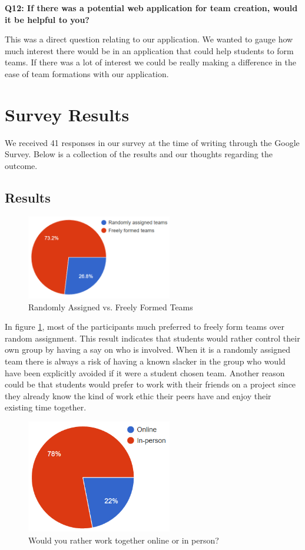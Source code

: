 \documentclass[conference]{IEEEtran}
\begin{document}
\textbf{Q12: If there was a potential web application for team creation, would it be helpful to you?}

This was a direct question relating to our application. We wanted to gauge how much interest there 
would be in an application that could help students to form teams. If there was a lot of interest
we could be really making a difference in the ease of team formations with our application. 

\section{Survey Results}
We received 41 responses in our survey at the time of writing through the Google Survey. Below
is a collection of the results and our thoughts regarding the outcome. 

\subsection{Results}

\begin{figure}[!ht]
\centering
\includegraphics[width=2.5in]{free_assigned}
\caption{Randomly Assigned vs. Freely Formed Teams}
\label{random_free}
\end{figure}

In figure \ref{random_free}, most of the participants much preferred to freely form teams over random
assignment. This result indicates that students would rather control their own group by having a say
on who is involved. When it is a randomly assigned team there is always a risk of having a known
slacker in the group who would have been explicitly avoided if it were a student chosen team. Another
reason could be that students would prefer to work with their friends on a project since they already
know the kind of work ethic their peers have and enjoy their existing time together. 

\begin{figure}[!ht]
\centering
\includegraphics[width=2.5in]{online_person}
\caption{Would you rather work together online or in person?}
\label{online_person}
\end{figure}
\end{document}
